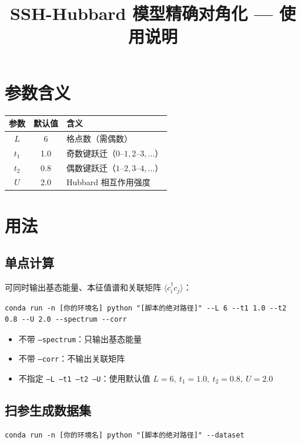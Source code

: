 \documentclass[12pt,a4paper]{article}
\title{SSH-Hubbard 模型精确对角化 — 使用说明}
\author{}
\date{}
\begin{document}
\maketitle


\section{参数含义}
\begin{table}[h!]
\centering
\begin{tabular}{ccl}
\toprule
参数 & 默认值 & 含义 \\
\midrule
$L$   & 6 & 格点数（需偶数） \\
$t_1$ & 1.0 & 奇数键跃迁（$0\text{--}1, 2\text{--}3, \dots$） \\
$t_2$ & 0.8 & 偶数键跃迁（$1\text{--}2, 3\text{--}4, \dots$） \\
$U$   & 2.0 & Hubbard 相互作用强度 \\
\bottomrule
\end{tabular}
\end{table}

\section{用法}

\subsection{单点计算}
可同时输出基态能量、本征值谱和关联矩阵 $\langle c_i^\dagger c_j \rangle$：
\begin{lstlisting}
conda run -n [你的环境名] python "[脚本的绝对路径]" --L 6 --t1 1.0 --t2 0.8 --U 2.0 --spectrum --corr
\end{lstlisting}

\begin{itemize}[nosep]
    \item 不带 \texttt{--spectrum}：只输出基态能量
    \item 不带 \texttt{--corr}：不输出关联矩阵
    \item 不指定 \texttt{--L --t1 --t2 --U}：使用默认值 $L=6,\ t_1=1.0,\ t_2=0.8,\ U=2.0$
\end{itemize}

\subsection{扫参生成数据集}
\begin{lstlisting}
conda run -n [你的环境名] python "[脚本的绝对路径]" --dataset
\end{lstlisting}
\end{document}
